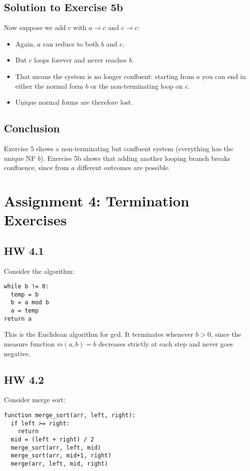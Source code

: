 \documentclass[11pt]{article}
\begin{document}
\subsection*{Solution to Exercise 5b}
Now suppose we add $c$ with $a\to c$ and $c\to c$:
\begin{itemize}
  \item Again, $a$ can reduce to both $b$ and $c$.
  \item But $c$ loops forever and never reaches $b$.
  \item That means the system is no longer confluent: starting from $a$ you can end
    in either the normal form $b$ or the non-terminating loop on $c$.
  \item Unique normal forms are therefore lost.
\end{itemize}

\subsection*{Conclusion}
Exercise 5 shows a non-terminating but confluent system (everything has the unique NF $b$).  
Exercise 5b shows that adding another looping branch breaks confluence, since from $a$
different outcomes are possible.

\section{Assignment 4: Termination Exercises}

\subsection*{HW 4.1}
Consider the algorithm:
\begin{verbatim}
while b != 0:
  temp = b
  b = a mod b
  a = temp
return a
\end{verbatim}

This is the Euclidean algorithm for gcd. It terminates whenever $b>0$,
since the measure function $m(a,b)=b$ decreases strictly at each step
and never goes negative.

\subsection*{HW 4.2}
Consider merge sort:
\begin{verbatim}
function merge_sort(arr, left, right):
  if left >= right:
    return
  mid = (left + right) / 2
  merge_sort(arr, left, mid)
  merge_sort(arr, mid+1, right)
  merge(arr, left, mid, right)
\end{verbatim}
\end{document}
